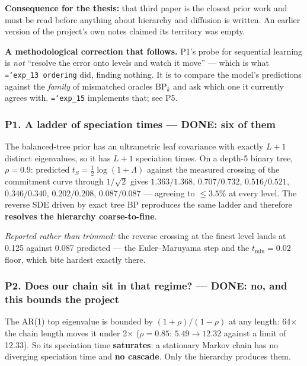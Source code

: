 \documentclass[11pt,a4paper]{article}
\newcommand{\done}{\textcolor{GoodGreen}{\textbf{DONE}}}
\newcommand{\code}[1]{\texttt{\small\hyphenchar\font=`\-\relax #1}}
\begin{document}
\begin{keybox}
\textbf{Consequence for the thesis:} that third paper is the closest prior work and must be
read before anything about hierarchy and diffusion is written. An earlier version of the
project's own notes claimed its territory was empty.
\end{keybox}

\medskip
\noindent
\textbf{A methodological correction that follows.} P1's probe for sequential learning is
\emph{not} ``resolve the error onto levels and watch it move'' --- which is what
\code{exp\_13 ordering} did, finding nothing. It is to compare the model's predictions
against the \emph{family} of mismatched oracles $\mathrm{BP}_k$ and ask which one it
currently agrees with. \code{exp\_15} implements that; see P5.

\subsubsection*{P1. A ladder of speciation times --- \done: six of them}

The balanced-tree prior has an ultrametric leaf covariance with exactly $L+1$ distinct
eigenvalues, so it has $L+1$ speciation times. On a depth-5 binary tree, $\rho=0.9$:
predicted $t_S = \tfrac12\log(1+\Lambda)$ against the measured crossing of the commitment
curve through $1/\sqrt2$ gives
$1.363/1.368$, $0.707/0.732$, $0.516/0.521$, $0.346/0.340$, $0.202/0.208$, $0.087/0.087$ ---
agreeing to $\le 3.5\%$ at every level. The reverse SDE driven by exact tree BP reproduces
the same ladder and therefore \textbf{resolves the hierarchy coarse-to-fine}.

\emph{Reported rather than trimmed:} the reverse crossing at the finest level lands at 0.125
against 0.087 predicted --- the Euler--Maruyama step and the $t_{\min}=0.02$ floor, which
bite hardest exactly there.

\subsubsection*{P2. Does our chain sit in that regime? --- \done: no, and this bounds the project}

The AR(1) top eigenvalue is bounded by $(1+\rho)/(1-\rho)$ at any length: 64$\times$ the
chain length moves it under 2$\times$ ($\rho=0.85$: $5.49 \to 12.32$ against a limit of
12.33). So its speciation time \textbf{saturates}: a stationary Markov chain has no diverging
speciation time and \textbf{no cascade}. Only the hierarchy produces them.
\end{document}

